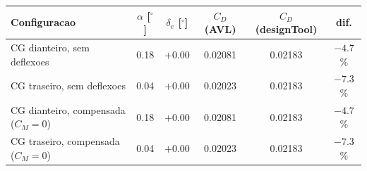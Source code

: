 \begin{tabular}{lccccc}
\toprule
Configuracao & $\alpha$ [$^\circ$] & $\delta_e$ [$^\circ$] & $C_D$ (AVL) & $C_D$ (designTool) & dif. \\
\midrule
CG dianteiro, sem deflexoes & 0.18 & $+0.00$ & 0.02081 & 0.02183 & $-4.7$\% \\
CG traseiro, sem deflexoes & 0.04 & $+0.00$ & 0.02023 & 0.02183 & $-7.3$\% \\
CG dianteiro, compensada ($C_M=0$) & 0.18 & $+0.00$ & 0.02081 & 0.02183 & $-4.7$\% \\
CG traseiro, compensada ($C_M=0$) & 0.04 & $+0.00$ & 0.02023 & 0.02183 & $-7.3$\% \\
\bottomrule
\end{tabular}
